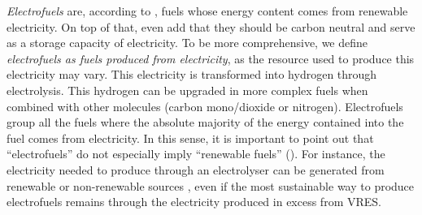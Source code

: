 

\textit{Electrofuels} are, according to \citet{JRC_alternative}, fuels whose energy content comes from renewable electricity. On top of that, \citet{goldmann2018} even add that they should be carbon neutral and serve as a storage capacity of electricity. To be more comprehensive, we define \textit{electrofuels as fuels produced from electricity}, as the resource used to produce this electricity may vary. This electricity is transformed into hydrogen through electrolysis. This hydrogen can be upgraded in more complex fuels when combined with other molecules (\eg carbon mono/dioxide or nitrogen). Electrofuels group all the fuels where the absolute majority of the energy contained into the fuel comes from electricity. In this sense, it is important to point out that ``electrofuels'' do not especially imply ``renewable fuels'' (). For instance, the electricity needed to produce  through an electrolyser can be generated from renewable or non-renewable sources \cite{bhandari2014}, even if the most sustainable way to produce electrofuels remains through the electricity produced in excess from \gls{VRES}.

